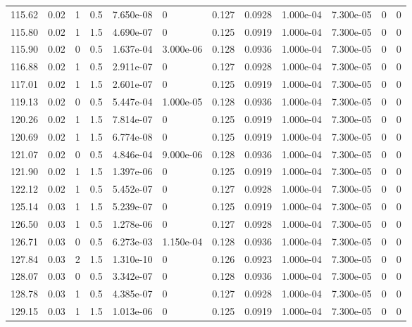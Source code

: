 \documentclass[preview]{standalone}
\begin{document}
{{{{\begin{tabular}{L{1.2cm}C{1.2cm} C{0.3cm}C{0.5cm} C{1.4cm}C{1.4cm} C{1.4cm}C{1.4cm} C{1.6cm}C{1.6cm} C{1.6cm}C{1.6cm}}
  115.62  &  0.02  & 1     & 0.5 &  7.650e-08  & 0  &  0.127&   0.0928& 1.000e-04 & 7.300e-05   &  0 & 0  \\ 
  115.80  &  0.02  & 1     & 1.5 &  4.690e-07  & 0  &  0.125&   0.0919& 1.000e-04 & 7.300e-05   &  0 & 0  \\ 
  115.90  &  0.02  & 0     & 0.5 &  1.637e-04  & 3.000e-06  &  0.128&   0.0936& 1.000e-04 & 7.300e-05   &  0 & 0  \\ 
  116.88  &  0.02  & 1     & 0.5 &  2.911e-07  & 0  &  0.127&   0.0928& 1.000e-04 & 7.300e-05   &  0 & 0  \\ 
  117.01  &  0.02  & 1     & 1.5 &  2.601e-07  & 0  &  0.125&   0.0919& 1.000e-04 & 7.300e-05   &  0 & 0  \\ 
  119.13  &  0.02  & 0     & 0.5 &  5.447e-04  & 1.000e-05  &  0.128&   0.0936& 1.000e-04 & 7.300e-05   &  0 & 0  \\ 
  120.26  &  0.02  & 1     & 1.5 &  7.814e-07  & 0  &  0.125&   0.0919& 1.000e-04 & 7.300e-05   &  0 & 0  \\ 
  120.69  &  0.02  & 1     & 1.5 &  6.774e-08  & 0  &  0.125&   0.0919& 1.000e-04 & 7.300e-05   &  0 & 0  \\ 
  121.07  &  0.02  & 0     & 0.5 &  4.846e-04  & 9.000e-06  &  0.128&   0.0936& 1.000e-04 & 7.300e-05   &  0 & 0  \\ 
  121.90  &  0.02  & 1     & 1.5 &  1.397e-06  & 0  &  0.125&   0.0919& 1.000e-04 & 7.300e-05   &  0 & 0  \\ 
  122.12  &  0.02  & 1     & 0.5 &  5.452e-07  & 0  &  0.127&   0.0928& 1.000e-04 & 7.300e-05   &  0 & 0  \\ 
  125.14  &  0.03  & 1     & 1.5 &  5.239e-07  & 0  &  0.125&   0.0919& 1.000e-04 & 7.300e-05   &  0 & 0  \\ 
  126.50  &  0.03  & 1     & 0.5 &  1.278e-06  & 0  &  0.127&   0.0928& 1.000e-04 & 7.300e-05   &  0 & 0  \\ 
  126.71  &  0.03  & 0     & 0.5 &  6.273e-03  & 1.150e-04  &  0.128&   0.0936& 1.000e-04 & 7.300e-05   &  0 & 0  \\ 
  127.84  &  0.03  & 2     & 1.5 &  1.310e-10  & 0  &  0.126&   0.0923& 1.000e-04 & 7.300e-05   &  0 & 0  \\ 
  128.07  &  0.03  & 0     & 0.5 &  3.342e-07  & 0  &  0.128&   0.0936& 1.000e-04 & 7.300e-05   &  0 & 0  \\ 
  128.78  &  0.03  & 1     & 0.5 &  4.385e-07  & 0  &  0.127&   0.0928& 1.000e-04 & 7.300e-05   &  0 & 0  \\ 
  129.15  &  0.03  & 1     & 1.5 &  1.013e-06  & 0  &  0.125&   0.0919& 1.000e-04 & 7.300e-05   &  0 & 0  \\ 

\end{tabular}}}}}
\end{document}
